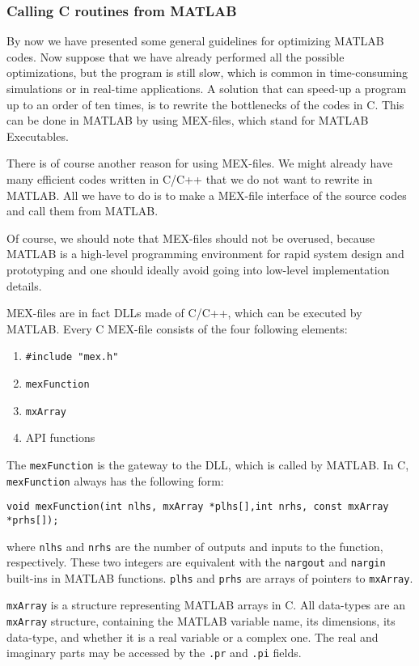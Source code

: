 \documentclass[10pt,a4paper]{article}
\begin{document}
\subsubsection{Calling C routines from MATLAB}
By now we have presented some general guidelines for optimizing MATLAB codes. Now suppose that we have already performed all the possible optimizations, but the program is still slow, which is common in time-consuming simulations or in real-time applications. A solution that can speed-up a program up to an order of ten times, is to rewrite the bottlenecks of the codes in C. This can be done in MATLAB by using MEX-files, which stand for MATLAB Executables.

There is of course another reason for using MEX-files. We might already have many efficient codes written in C/C++ that we do not want to rewrite in MATLAB. All we have to do is to make a MEX-file interface of the source codes and call them from MATLAB.

Of course, we should note that MEX-files should not be overused, because MATLAB is a high-level programming environment for rapid system design and prototyping and one should ideally avoid going into low-level implementation details.

MEX-files are in fact DLLs made of C/C++, which can be executed by MATLAB. Every C MEX-file consists of the four following elements:
\begin{enumerate}
\item \texttt{\#include "mex.h"}
\item \texttt{mexFunction}
\item \texttt{mxArray}
\item API functions
\end{enumerate}
The \texttt{mexFunction} is the gateway to the DLL, which is called by MATLAB. In C, \texttt{mexFunction} always has the following form:
\begin{lstlisting}
void mexFunction(int nlhs, mxArray *plhs[],int nrhs, const mxArray *prhs[]);
\end{lstlisting}
where \texttt{nlhs} and \texttt{nrhs} are the number of outputs and inputs to the function, respectively. These two integers are equivalent with the \texttt{nargout} and \texttt{nargin} built-ins in MATLAB functions. \texttt{plhs} and \texttt{prhs} are arrays of pointers to \texttt{mxArray}.

\texttt{mxArray} is a structure representing MATLAB arrays in C. All data-types are an \texttt{mxArray} structure, containing the MATLAB variable name, its dimensions, its data-type, and whether it is a real variable or a complex one. The real and imaginary parts may be accessed by the \texttt{.pr} and \texttt{.pi} fields.
\end{document}

